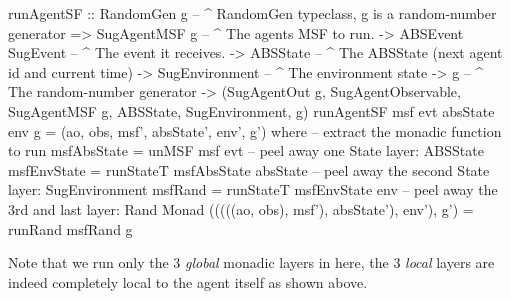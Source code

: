 \begin{HaskellCode}
runAgentSF :: RandomGen g        -- ^ RandomGen typeclass, g is a random-number generator
           => SugAgentMSF g      -- ^ The agents MSF to run.
           -> ABSEvent SugEvent  -- ^ The event it receives.
           -> ABSState           -- ^ The ABSState (next agent id and current time)
           -> SugEnvironment     -- ^ The environment state
           -> g                  -- ^ The random-number generator
           -> (SugAgentOut g, SugAgentObservable, SugAgentMSF g, ABSState, SugEnvironment, g)
runAgentSF msf evt absState env g = (ao, obs, msf', absState', env', g') 
  where
    -- extract the monadic function to run
    msfAbsState = unMSF msf evt
    -- peel away one State layer: ABSState
    msfEnvState = runStateT msfAbsState absState
    -- peel away the second State layer: SugEnvironment
    msfRand     = runStateT msfEnvState env
    -- peel away the 3rd and last layer: Rand Monad
    (((((ao, obs), msf'), absState'), env'), g') = runRand msfRand g
\end{HaskellCode}

Note that we run only the 3 \textit{global} monadic layers in here, the 3 \textit{local} layers are indeed completely local to the agent itself as shown above.